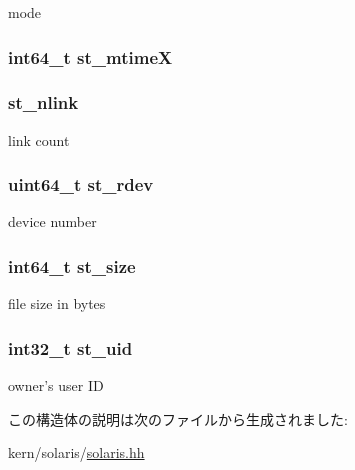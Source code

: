 mode \hypertarget{structSolaris_1_1tgt__stat_a85f7ee07d7d01bcbae6a22cc45f01846}{
\subsubsection[{st\_\-mtimeX}]{\setlength{\rightskip}{0pt plus 5cm}int64\_\-t {\bf st\_\-mtimeX}}}
\label{structSolaris_1_1tgt__stat_a85f7ee07d7d01bcbae6a22cc45f01846}
\hypertarget{structSolaris_1_1tgt__stat_ab77c257c135fa586e930ef0bf0977c08}{
\subsubsection[{st\_\-nlink}]{ {\bf st\_\-nlink}}}
\label{structSolaris_1_1tgt__stat_ab77c257c135fa586e930ef0bf0977c08}


link count \hypertarget{structSolaris_1_1tgt__stat_ac430407fd3b0e421da1ee8f66c95a786}{
\subsubsection[{st\_\-rdev}]{\setlength{\rightskip}{0pt plus 5cm}uint64\_\-t {\bf st\_\-rdev}}}
\label{structSolaris_1_1tgt__stat_ac430407fd3b0e421da1ee8f66c95a786}


device number \hypertarget{structSolaris_1_1tgt__stat_aec608d79c93ed6d010aec9f7487e0064}{
\subsubsection[{st\_\-size}]{\setlength{\rightskip}{0pt plus 5cm}int64\_\-t {\bf st\_\-size}}}
\label{structSolaris_1_1tgt__stat_aec608d79c93ed6d010aec9f7487e0064}


file size in bytes \hypertarget{structSolaris_1_1tgt__stat_a3bb3835f9991cdc69a5cea7ca39fbaaa}{
\subsubsection[{st\_\-uid}]{\setlength{\rightskip}{0pt plus 5cm}int32\_\-t {\bf st\_\-uid}}}
\label{structSolaris_1_1tgt__stat_a3bb3835f9991cdc69a5cea7ca39fbaaa}


owner's user ID 

この構造体の説明は次のファイルから生成されました:\begin{DoxyCompactItemize}
\item 
kern/solaris/\hyperlink{kern_2solaris_2solaris_8hh}{solaris.hh}\end{DoxyCompactItemize}
